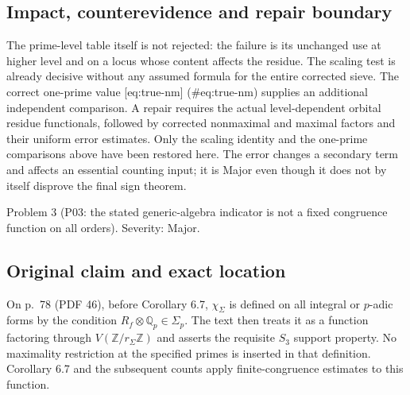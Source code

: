 \documentclass[10pt]{article}
\begin{document}
\subsection*{Impact, counterevidence and repair boundary}
The prime-level table itself is not rejected: the failure is its unchanged use at higher level and on a locus whose content affects the residue. The scaling test is already decisive without any assumed formula for the entire corrected sieve. The correct one-prime value [eq:true-nm] (\#eq:true-nm) supplies an additional independent comparison. A repair requires the actual level-dependent orbital residue functionals, followed by corrected nonmaximal and maximal factors and their uniform error estimates. Only the scaling identity and the one-prime comparisons above have been restored here. The error changes a secondary term and affects an essential counting input; it is Major even though it does not by itself disprove the final sign theorem.\par
Problem 3 (P03: the stated generic-algebra indicator is not a fixed congruence function on all orders).  Severity: Major.\par
\subsection*{Original claim and exact location}
On p. 78 (PDF 46), before Corollary 6.7, \(\chi_\Sigma\) is defined on all integral or \(p\)-adic forms by the condition \(R_f\otimes\mathbb Q_p\in\Sigma_p\). The text then treats it as a function factoring through \(V(\mathbb Z/r_\Sigma\mathbb Z)\) and asserts the requisite \(S_3\) support property. No maximality restriction at the specified primes is inserted in that definition. Corollary 6.7 and the subsequent counts apply finite-congruence estimates to this function.\par
\end{document}
